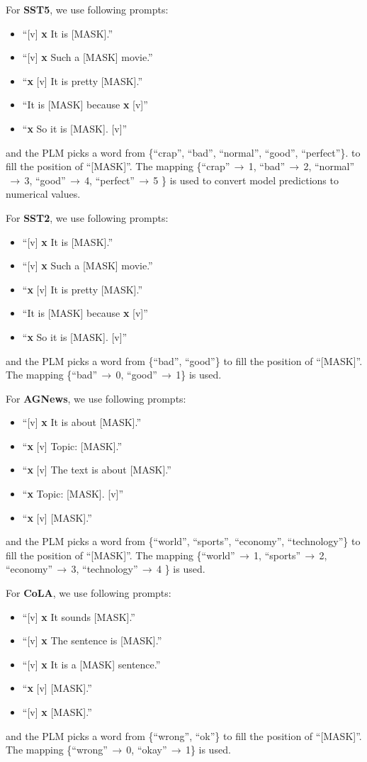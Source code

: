 For \textbf{SST5}, we use following prompts:
\begin{itemize}
\item ``[v] \textbf{x} It is [MASK].''
\item ``[v] \textbf{x} Such a [MASK] movie.''
\item ``\textbf{x} [v] It is pretty [MASK].''
\item ``It is [MASK] because \textbf{x} [v]''
\item ``\textbf{x} So it is [MASK]. [v]''
\end{itemize}
and the PLM picks a word from
\{``crap'', ``bad'', ``normal'', ``good'', ``perfect''\}.
to fill the position of ``[MASK]''.
The mapping
\{``crap''$\,\to\,$1,
``bad''$\,\to\,$2,
``normal''$\,\to\,$3,
``good''$\,\to\,$4,
``perfect''$\,\to\,$5
\} is used to convert
model predictions to numerical values.


For \textbf{SST2}, we use following prompts:
\begin{itemize}
\item ``[v] \textbf{x} It is [MASK].''
\item ``[v] \textbf{x} Such a [MASK] movie.''
\item ``\textbf{x} [v] It is pretty [MASK].''
\item ``It is [MASK] because \textbf{x} [v]''
\item ``\textbf{x} So it is [MASK]. [v]''
\end{itemize}
and the PLM picks a word from
\{``bad'', ``good''\}
to fill the position of ``[MASK]''.
The mapping
\{``bad''$\,\to\,$0, ``good''$\,\to\,$1\}
is used.



For \textbf{AGNews}, we use following prompts:
\begin{itemize}
\item ``[v] \textbf{x} It is about [MASK].''
\item ``\textbf{x} [v] Topic: [MASK].''
\item ``\textbf{x} [v] The text is about [MASK].''
\item ``\textbf{x} Topic: [MASK]. [v]''
\item ``\textbf{x} [v] [MASK].''
\end{itemize}
and the PLM picks a word from
\{``world'', ``sports'', ``economy'', ``technology''\}
to fill the position of ``[MASK]''.
The mapping
\{``world''$\,\to\,$1,
``sports''$\,\to\,$2,
``economy''$\,\to\,$3,
``technology''$\,\to\,$4
\} is used.


For \textbf{CoLA}, we use following prompts:
\begin{itemize}
\item ``[v] \textbf{x} It sounds [MASK].''
\item ``[v] \textbf{x} The sentence is [MASK].''
\item ``[v] \textbf{x} It is a [MASK] sentence.''
\item ``\textbf{x} [v] [MASK].''
\item ``[v] \textbf{x} [MASK].''
\end{itemize}
and the PLM picks a word from
\{``wrong'', ``ok''\}
to fill the position of ``[MASK]''.
The mapping
\{``wrong''$\,\to\,$0,
``okay''$\,\to\,$1\}
is used.


